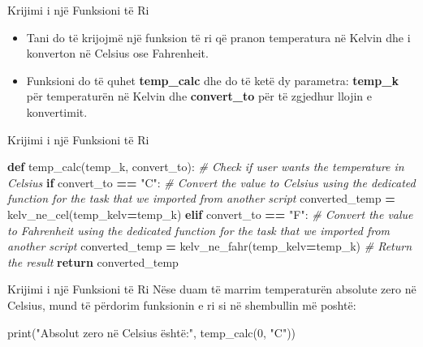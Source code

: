 \documentclass[
  ignorenonframetext,
]{beamer}
\newenvironment{Shaded}{\begin{snugshade}}{\end{snugshade}}
\newcommand{\BuiltInTok}[1]{#1}
\newcommand{\CommentTok}[1]{\textcolor[rgb]{0.56,0.35,0.01}{\textit{#1}}}
\newcommand{\ControlFlowTok}[1]{\textcolor[rgb]{0.13,0.29,0.53}{\textbf{#1}}}
\newcommand{\DecValTok}[1]{\textcolor[rgb]{0.00,0.00,0.81}{#1}}
\newcommand{\KeywordTok}[1]{\textcolor[rgb]{0.13,0.29,0.53}{\textbf{#1}}}
\newcommand{\NormalTok}[1]{#1}
\newcommand{\OperatorTok}[1]{\textcolor[rgb]{0.81,0.36,0.00}{\textbf{#1}}}
\newcommand{\StringTok}[1]{\textcolor[rgb]{0.31,0.60,0.02}{#1}}
\begin{document}
\begin{frame}{Krijimi i një Funksioni të Ri}
\protect\hypertarget{krijimi-i-njuxeb-funksioni-tuxeb-ri}{}
\begin{itemize}
\item
  Tani do të krijojmë një funksion të ri që pranon temperatura në Kelvin
  dhe i konverton në Celsius ose Fahrenheit.
\item
  Funksioni do të quhet \textbf{temp\_calc} dhe do të ketë dy parametra:
  \textbf{temp\_k} për temperaturën në Kelvin dhe \textbf{convert\_to}
  për të zgjedhur llojin e konvertimit.
\end{itemize}
\end{frame}

\begin{frame}[fragile]{Krijimi i një Funksioni të Ri}
\protect\hypertarget{krijimi-i-njuxeb-funksioni-tuxeb-ri-1}{}
\begin{Shaded}
\begin{Highlighting}[]
\KeywordTok{def}\NormalTok{ temp\_calc(temp\_k, convert\_to):}
    \CommentTok{\# Check if user wants the temperature in Celsius}
    \ControlFlowTok{if}\NormalTok{ convert\_to }\OperatorTok{==} \StringTok{"C"}\NormalTok{:}
        \CommentTok{\# Convert the value to Celsius using the dedicated function for the task that we imported from another script}
\NormalTok{        converted\_temp }\OperatorTok{=}\NormalTok{ kelv\_ne\_cel(temp\_kelv}\OperatorTok{=}\NormalTok{temp\_k)}
    \ControlFlowTok{elif}\NormalTok{ convert\_to }\OperatorTok{==} \StringTok{"F"}\NormalTok{:}
        \CommentTok{\# Convert the value to Fahrenheit using the dedicated function for the task that we imported from another script}
\NormalTok{        converted\_temp }\OperatorTok{=}\NormalTok{ kelv\_ne\_fahr(temp\_kelv}\OperatorTok{=}\NormalTok{temp\_k)}
    \CommentTok{\# Return the result}
    \ControlFlowTok{return}\NormalTok{ converted\_temp}
\end{Highlighting}
\end{Shaded}
\end{frame}

\begin{frame}[fragile]{Krijimi i një Funksioni të Ri}
\protect\hypertarget{krijimi-i-njuxeb-funksioni-tuxeb-ri-2}{}
Nëse duam të marrim temperaturën absolute zero në Celsius, mund të
përdorim funksionin e ri si në shembullin më poshtë:

\begin{Shaded}
\begin{Highlighting}[]
\BuiltInTok{print}\NormalTok{(}\StringTok{"Absolut zero në Celsius është:"}\NormalTok{, temp\_calc(}\DecValTok{0}\NormalTok{, }\StringTok{"C"}\NormalTok{))}
\end{Highlighting}
\end{Shaded}
\end{frame}
\end{document}
